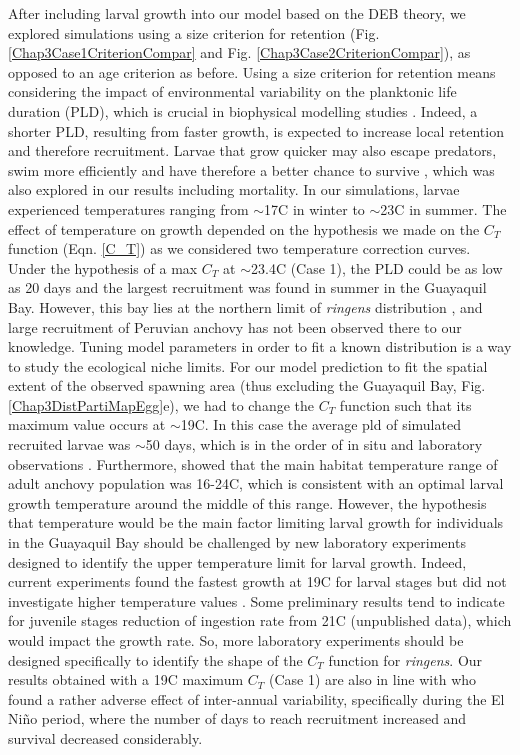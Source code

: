 After including larval growth into our model based on the DEB theory, we explored simulations using a size criterion for retention (Fig. \ref{Chap3Case1CriterionCompar} and Fig. \ref{Chap3Case2CriterionCompar}), as opposed to an age criterion as before. Using a size criterion for retention means considering the impact of environmental variability on the planktonic life duration (PLD), which is crucial in biophysical modelling studies \citep{LettAyat2010}. Indeed, a shorter PLD, resulting from faster growth, is expected to increase local retention and therefore recruitment. Larvae that grow quicker may also escape predators, swim more efficiently and have therefore a better chance to survive \citep{Houd2008}, which was also explored in our results including mortality. In our simulations, larvae experienced temperatures ranging from $\sim$17\textdegree C in winter to $\sim$23\textdegree C in summer. The effect of temperature on growth depended on the hypothesis we made on the $C_T$ function (Eqn. \ref{C_T}) as we considered two temperature correction curves. Under the hypothesis of a max $C_T$ at $\sim$23.4\textdegree C (Case 1), the PLD could be as low as 20 days and the largest recruitment was found in summer in the Guayaquil Bay. However, this bay lies at the northern limit of \textit{\gls{ringens}} distribution \citep{CaldAyor2020}, and large recruitment of Peruvian anchovy has not been observed there to our knowledge. Tuning model parameters in order to fit a known distribution is a way to study the ecological niche limits. For our model prediction to fit the spatial extent of the observed spawning area (thus excluding the Guayaquil Bay, Fig. \ref{Chap3DistPartiMapEgg}e), we had to change the $C_T$ function such that its maximum value occurs at $\sim$19\textdegree C. In this case the average \acrshort{pld} of simulated recruited larvae was $\sim$50 days, which is in the order of in situ and laboratory observations \citep{PaloMuck1987}. Furthermore, \citep{CastPena2022} showed that the main habitat temperature range of adult anchovy population was 16-24\textdegree C, which is consistent with an optimal larval growth temperature around the middle of this range. However, the hypothesis that temperature would be the main factor limiting larval growth for individuals in the Guayaquil Bay should be challenged by new laboratory experiments designed to identify the upper temperature limit for larval growth. Indeed, current experiments found the fastest growth at 19\textdegree C for larval stages but did not investigate higher temperature values \citep{RiouOfel2021}. Some preliminary results tend to indicate for juvenile stages reduction of ingestion rate from 21\textdegree C (unpublished data), which would impact the growth rate. So, more laboratory experiments should be designed specifically to identify the shape of the $C_T$ function for \textit{\gls{ringens}}. Our results obtained with a 19\textdegree C maximum $C_T$ (Case 1) are also in line with \cite{XuChai2013} who found a rather adverse effect of inter-annual variability, specifically during the El Niño period, where the number of days to reach recruitment increased and survival decreased considerably.\\

